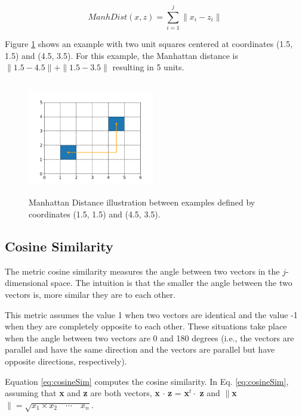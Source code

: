 \begin{equation}
    ManhDist(x,z) = \sum_{i=1}^{j} \|x_{i} - z_{i}\| 
    \label{eq:manDistance}
\end{equation}


Figure \ref{fig:manDistance} shows an example with two unit squares centered at coordinates (1.5, 1.5) and (4.5, 3.5). For this example, the Manhattan distance is $\|1.5 - 4.5\| + \|1.5 - 3.5\|$ resulting in 5 units.
 
\begin{figure}[h]
    \centering
    \includegraphics[height = 5cm, width =  5.5cm]{"Part 3 - Learning Systems/Supervised Learning/k-Nearest Neighbors/figures/manhattanDistance.png"}
    \caption{Manhattan Distance illustration between examples defined by coordinates (1.5, 1.5) and (4.5, 3.5).}
    \label{fig:manDistance}
\end{figure}

\subsection{Cosine Similarity}

The metric cosine similarity \cite{han2012mining} measures the angle between two vectors in the $j$-dimensional space. The intuition is that the smaller the angle between the two vectors is, more similar they are to each other.

This metric assumes the value 1 when two vectors are identical and the value -1 when they are completely opposite to each other. These situations take place when the angle between two vectors are 0 and 180 degrees (i.e., the vectors are parallel and have the same direction and the vectors are parallel but have opposite directions, respectively).

Equation \ref{eq:cosineSim} computes the cosine similarity. In Eq. \ref{eq:cosineSim}, assuming that \textbf{x} and \textbf{z} are both vectors, \textbf{x} $\cdot$ \textbf{z} = \textbf{x}$^t \cdot$ \textbf{z} and $\|$\textbf{x}$\| = \sqrt{x_1 \times x_2 \quad \cdots \quad x_n}$.

